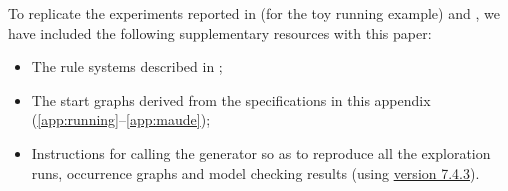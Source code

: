To replicate the \GROOVE experiments reported in  (for the toy running example) and , we have included the following supplementary resources with this paper:
\begin{itemize}
\item The rule systems described in ;
\item The start graphs derived from the \BioResolve specifications in this appendix (\ref{app:running}--\ref{app:maude});
\item Instructions for calling the \GROOVE generator so as to reproduce all the exploration runs, occurrence graphs and model checking results (using \href{https://github.com/nl-utwente-groove/code/releases/tag/release-7_4_3}{\GROOVE version 7.4.3}).
\end{itemize}

